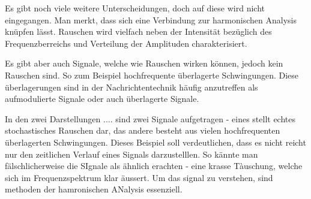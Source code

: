 Es gibt noch viele weitere Unterscheidungen, doch auf diese wird nicht eingegangen. Man merkt, dass sich eine Verbindung zur harmonischen Analysis knüpfen lässt. Rauschen wird vielfach neben der Intensität bezüglich des Frequenzberreichs und Verteilung der Amplituden charakterisiert.


Es gibt aber auch Signale, welche wie Rauschen wirken können, jedoch kein Rauschen sind. So zum Beispiel hochfrequente überlagerte Schwingungen. Diese überlagerungen sind in der Nachrichtentechnik häufig anzutreffen als aufmodulierte Signale oder auch überlagerte Signale.
 
In den zwei Darstellungen .... sind zwei Signale aufgetragen - eines stellt echtes stochastisches Rauschen dar, das andere besteht aus vielen hochfrequenten überlagerten Schwingungen. Dieses Beispiel soll verdeutlichen, dass es nicht reicht nur den zeitlichen Verlauf eines Signals darzustelllen. So kännte man fälschlicherweise die SIgnale als ähnlich erachten - eine krasse Tàuschung, welche sich im Frequenzspektrum klar äussert. Um das signal zu verstehen, sind methoden  der hamronischen ANalysis essenziell. 


